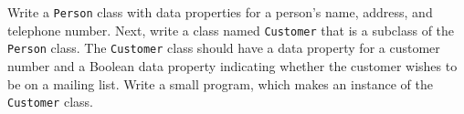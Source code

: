 Write a \texttt{Person} class with data properties for a person's name, address, and telephone number. Next, write a class named \texttt{Customer} that is a subclass of the \texttt{Person} class. The \texttt{Customer} class should have a data property for a customer number and a Boolean data property indicating whether the customer wishes to be on a mailing list. Write a small program, which makes an instance of the \texttt{Customer} class.
